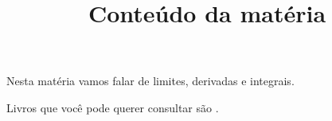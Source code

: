 \documentclass[12pt]{memoir}
\begin{document}
\title{Conteúdo da matéria}
\maketitle

Nesta matéria vamos falar de limites,
derivadas e integrais.

Livros que você pode querer consultar são
\cite{apostol,stewart}.



\end{document}
